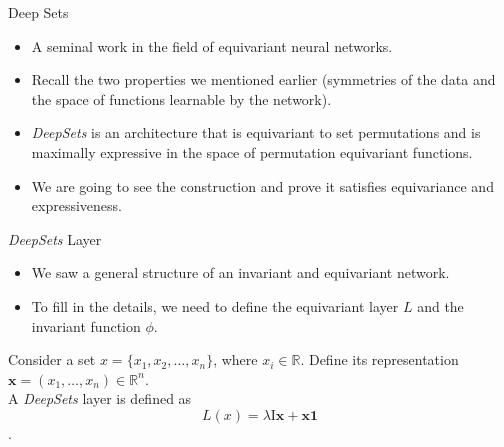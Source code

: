 \documentclass{beamer}
\begin{document}
\begin{frame}{Deep Sets}

    \begin{itemize}
        \setlength{\itemsep}{\fill}
        \item A seminal work in the field of equivariant neural networks. 
        \item Recall the two properties we mentioned earlier (symmetries of the data and the space of functions learnable by the network).
        \item \emph{DeepSets} is an architecture that is equivariant to set permutations and is maximally expressive in the space of permutation equivariant functions.
        \item We are going to see the construction and prove it satisfies equivariance and expressiveness.
    \end{itemize}
    
\end{frame}
\begin{frame}{\emph{DeepSets} Layer}

    \begin{itemize}
        \setlength{\itemsep}{\fill}
        \item We saw a general structure of an invariant and equivariant network.
        \item To fill in the details, we need to define the equivariant layer $L$ and the invariant function $\phi$.
    \end{itemize}

    \begin{definition}
        Consider a set $x = \{x_1, x_2, \ldots, x_n\}$, where $x_i \in \mathbb{R}$. Define its representation $\mathbf{x} = (x_1, \dots, x_n) \in \mathbb{R}^n$.\\
        A \emph{DeepSets} layer is defined as 
        \[L(x) = \lambda\mathrm{I}\mathbf{x} + \mathbf{x}\mathbf{1}\].
    \end{definition}
    
\end{frame}
\end{document}
